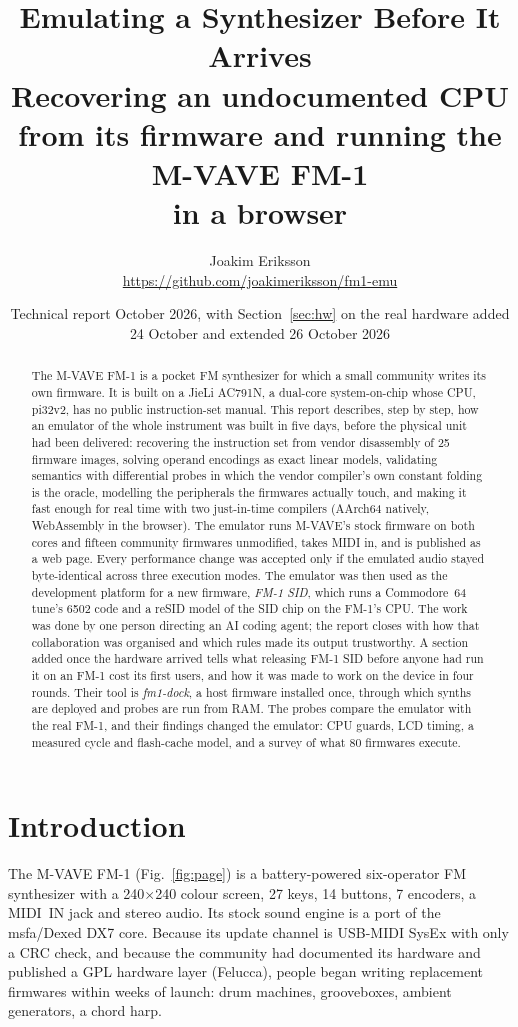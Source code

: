 \documentclass[10pt,a4paper]{article}
\title{\textbf{Emulating a Synthesizer Before It Arrives}\\[2pt]
\large Recovering an undocumented CPU from its firmware and running the M-VAVE FM-1\\ in a browser}
\author{Joakim Eriksson\\\small\url{https://github.com/joakimeriksson/fm1-emu}}
\date{Technical report \quad\textperiodcentered\quad 13 October 2026, with Section~\ref{sec:hw} on the real hardware added 24 October and extended 26 October 2026}
\begin{document}
\maketitle

\begin{abstract}
\noindent
The M-VAVE FM-1 is a pocket FM synthesizer for which a small community writes its own firmware.
It is built on a JieLi AC791N, a dual-core system-on-chip whose CPU, pi32v2, has no public
instruction-set manual. This report describes, step by step, how an emulator of the whole
instrument was built in five days, before the physical unit had been delivered: recovering the
instruction set from vendor disassembly of 25 firmware images, solving operand encodings as exact
linear models, validating semantics with differential probes in which the vendor compiler's own
constant folding is the oracle, modelling the peripherals the firmwares actually touch, and making
it fast enough for real time with two just-in-time compilers (AArch64 natively, WebAssembly in the
browser). The emulator runs M-VAVE's stock firmware on both cores and fifteen community firmwares
unmodified, takes MIDI in, and is published as a web page. Every performance change was accepted
only if the emulated audio stayed byte-identical across three execution modes. The emulator was
then used as the development platform for a new firmware, \emph{FM-1 SID}, which runs a Commodore~64
tune's 6502 code and a reSID model of the SID chip on the FM-1's CPU. The work was done by one person
directing an AI coding agent; the report closes with how that collaboration was organised and which
rules made its output trustworthy. A section added once the hardware arrived tells what releasing
FM-1 SID before anyone had run it on an FM-1 cost its first users, and how it was made to work on the
device in four rounds. Their tool is \emph{fm1-dock}, a host firmware installed once, through which
synths are deployed and probes are run from RAM. The probes compare the emulator with the real FM-1,
and their findings changed the emulator: CPU guards, LCD timing, a measured cycle and flash-cache
model, and a survey of what 80 firmwares execute.
\end{abstract}

\section{Introduction}

The M-VAVE FM-1 (Fig.~\ref{fig:page}) is a battery-powered six-operator FM synthesizer with a
240$\times$240 colour screen, 27 keys, 14 buttons, 7 encoders, a MIDI~IN jack and stereo audio.
Its stock sound engine is a port of the msfa/Dexed DX7 core. Because its update channel is USB-MIDI
SysEx with only a CRC check, and because the community had documented its hardware and published a
GPL hardware layer (Felucca), people began writing replacement firmwares within weeks of launch:
drum machines, grooveboxes, ambient generators, a chord harp.
\end{document}
